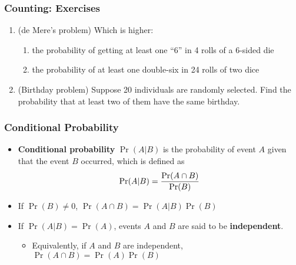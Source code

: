 \documentclass[pdflatex, 12pt]{beamer}
\begin{document}
\begin{frame}
\frametitle{Counting: Exercises}
\begin{enumerate}
\item (de Mere's problem) Which is higher:
 \begin{enumerate}
 \item the probability of getting at least one ``6'' in 4 rolls of a 6-sided die
 \item the probability of at least one double-six in 24 rolls of two dice
 \end{enumerate}
\vspace{0.4cm}
\item (Birthday problem) Suppose 20 individuals are randomly selected. Find the probability that at least two of them have the same birthday. 	
\end{enumerate}
\end{frame}


\begin{frame}
\frametitle{Conditional Probability}
\begin{itemize}
\item \textbf{Conditional probability} $\Pr(A|B)$ is the probability of event $A$ given that the event $B$ occurred, which is defined as 
 \begin{equation}
 \Pr(A|B) = \frac{\Pr(A \cap B)}{\Pr(B)} \notag
 \end{equation}
\vspace{0.2cm}
\item If $\Pr(B) \neq 0$, $\Pr(A \cap B) = \Pr(A|B)\Pr(B)$
\vspace{0.4cm}
\item If $\Pr(A|B) = \Pr(A)$, events $A$ and $B$ are said to be \textbf{independent}.
 \begin{itemize}
 \item Equivalently, if $A$ and $B$ are independent, $\Pr(A \cap B) = \Pr(A)\Pr(B)$
 \end{itemize}
\end{itemize}
\end{frame}
\end{document}
